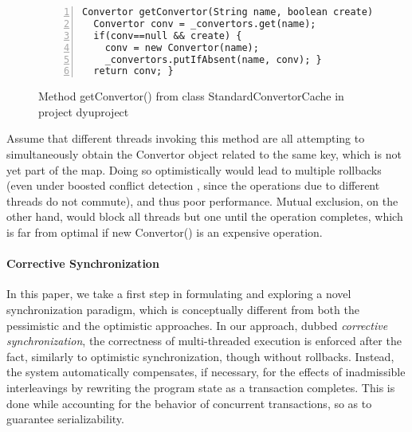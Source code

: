 
\begin{figure}
	\begin{lstlisting}[numbers=left]
Convertor getConvertor(String name, boolean create) {
  Convertor conv = _convertors.get(name);
  if(conv==null && create) {
    conv = new Convertor(name);
    _convertors.putIfAbsent(name, conv); }
  return conv; }
	\end{lstlisting}
	\caption{\label{Fi:introMotivating}Method {\sf getConvertor()} from class {\sf StandardConvertorCache} in project {\sf dyuproject}}
\end{figure}

Assume that different threads invoking this method are all attempting to simultaneously obtain the {\sf Convertor} object related to the same key, which is not yet part of the map. Doing so optimistically would lead to multiple rollbacks (even under boosted conflict detection \cite{ppopp08}, since the operations due to different threads do not commute), and thus poor performance. Mutual exclusion, on the other hand, would block all threads but one until the operation completes, which is far from optimal if {\sf new Convertor()} is an expensive operation.

\paragraph{Corrective Synchronization} In this paper, we take a first step in formulating and exploring a novel synchronization paradigm, which is conceptually different from both the pessimistic and the optimistic approaches. In our approach, dubbed \emph{corrective synchronization}, the correctness of multi-threaded execution is enforced after the fact, similarly to optimistic synchronization, though without rollbacks. Instead, the system automatically compensates, if necessary, for the effects of inadmissible interleavings by rewriting the program state as a transaction completes. This is done while accounting for the behavior of concurrent transactions, so as to guarantee serializability.

